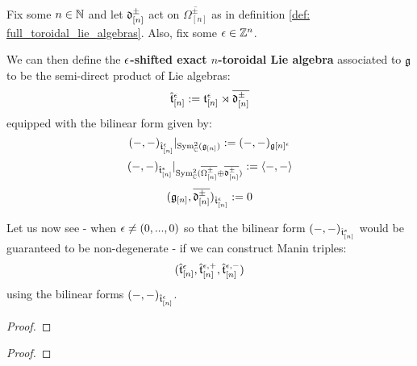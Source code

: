             \begin{definition} \label{def: exact_toroidal_lie_algebras}
                Fix some $n \in \mathbb{N}$ and let $\mathfrak{d}_{[n]}^{\pm}$ act on $\overline{\Omega_{[n]}^{\pm}}$ as in definition \ref{def: full_toroidal_lie_algebras}. Also, fix some $\epsilon \in \mathbb{Z}^n$.

                We can then define the \textbf{$\epsilon$-shifted exact $n$-toroidal Lie algebra} associated to $\mathfrak{g}$ to be the semi-direct product of Lie algebras:
                    $$\hat{\mathfrak{t}}_{[n]}^{\epsilon} := \mathfrak{t}_{[n]}^{\epsilon} \rtimes \overline{\mathfrak{d}_{[n]}^{\pm}}$$
                equipped with the bilinear form given by:
                    $$(-, -)_{ \hat{\mathfrak{t}}_{[n]}^{\epsilon} }|_{ \mathrm{Sym}^2_{\mathbb{C}}( \mathfrak{g}_{[n]} ) } := (-, -)_{\mathfrak{g}[n]^{\epsilon}}$$
                    $$(-, -)_{ \hat{\mathfrak{t}}_{[n]}^{\epsilon} }|_{\mathrm{Sym}^2_{\mathbb{C}}( \overline{\Omega_{[n]}^{\pm}} \oplus \overline{\mathfrak{d}_{[n]}^{\pm}} )} := \langle-, -\rangle$$
                    $$( \mathfrak{g}_{[n]}, \overline{\mathfrak{d}_{[n]}^{\pm}} )_{ \hat{\mathfrak{t}}_{[n]}^{\epsilon} } := 0$$
            \end{definition}

            Let us now see - when $\epsilon \not = (0, ..., 0)$ so that the bilinear form $(-, -)_{\hat{\mathfrak{t}}_{[n]}^{\epsilon}}$ would be guaranteed to be non-degenerate - if we can construct Manin triples:
                $$( \hat{\mathfrak{t}}_{[n]}^{\epsilon}, \hat{\mathfrak{t}}_{[n]}^{\epsilon, +}, \hat{\mathfrak{t}}_{[n]}^{\epsilon, -} )$$
            using the bilinear forms $(-, -)_{ \hat{\mathfrak{t}}_{[n]}^{\epsilon} }$. 
            \begin{theorem} \label{theorem: exact_toroidal_manin_triples}
                
            \end{theorem}
                \begin{proof}
                    
                \end{proof}
            \begin{corollary} \label{coro: exact_toroidal_lie_bialgebras}
                
            \end{corollary}
                \begin{proof}
                    
                \end{proof}
            
    \printbibliography

